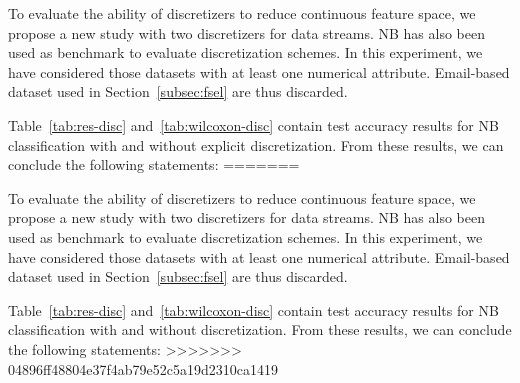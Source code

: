 \documentclass[preprint,12pt]{elsarticle}
\begin{document}
\begin{itemize}
To evaluate the ability of discretizers to reduce continuous feature space, we propose a new study with two discretizers for data streams. NB has also been used as benchmark to evaluate discretization schemes. In this experiment, we have considered those datasets with at least one numerical attribute. Email-based dataset used in Section~\ref{subsec:fsel} are thus discarded.

Table~\ref{tab:res-disc} and~\ref{tab:wilcoxon-disc} contain test accuracy results for NB classification with and without explicit discretization. From these results, we can conclude the following statements:
=======
\label{subsec:disc}

To evaluate the ability of discretizers to reduce continuous feature space, we propose a new study with two discretizers for data streams. NB has also been used as benchmark to evaluate discretization schemes. In this experiment, we have considered those datasets with at least one numerical attribute. Email-based dataset used in Section~\ref{subsec:fsel} are thus discarded.

Table~\ref{tab:res-disc} and~\ref{tab:wilcoxon-disc} contain test accuracy results for NB classification with and without discretization. From these results, we can conclude the following statements:
>>>>>>> 04896ff48804e37f4ab79e52c5a19d2310ca1419


\end{itemize}
\end{document}
